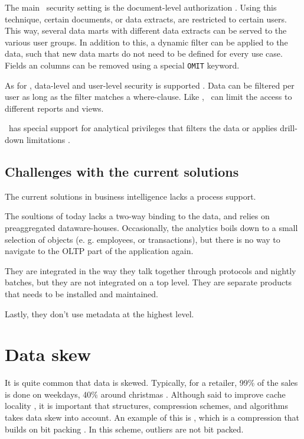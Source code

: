 The main \qlikview~security setting is the document-level authorization \cite{Qlik2011-hj}. Using this technique, certain documents, or data extracts, are restricted to certain users. This way, several data marts with different data extracts can be served to the various user groups. In addition to this, a dynamic filter can be applied to the data, such that new data marts do not need to be defined for every use case. Fields an columns can be removed using a special \texttt{OMIT} keyword.

As for \tableau, data-level and user-level security is supported \cite{Kamkolkar2015-iq}. Data can be filtered per user as long as the filter matches a where-clause. Like \qlikview, \tableau~can limit the access to different reports and views.

\saph~has special support for analytical privileges that filters the data or applies drill-down limitations \cite{Primsch2011-ij}.

\subsection{Challenges with the current solutions}
The current solutions in business intelligence lacks a process support.

The soultions of today lacks a two-way binding to the data, and relies on preaggregated dataware-houses. Occasionally, the analytics boils down to a small selection of objects (e. g. employees, or transactions), but there is no way to navigate to the OLTP part of the application again.

They are integrated in the way they talk together through protocols and nightly batches, but they are not integrated on a top level. They are separate products that needs to be installed and maintained.

Lastly, they don't use metadata at the highest level.

%
%

\section{Data skew}
\label{sec:Data skew}
It is quite common that data is skewed. Typically, for a retailer, 99\% of the sales is done on weekdays, 40\% around christmas \cite{Raman2008-gi}. Although said to improve cache locality \cite{Larson2013-mc}, it is important that structures, compression schemes, and algorithms takes data skew into account. An example of this is , which is a compression that builds on bit packing \cite{Bjorklund2011-wh}. In this scheme, outliers are not bit packed.


